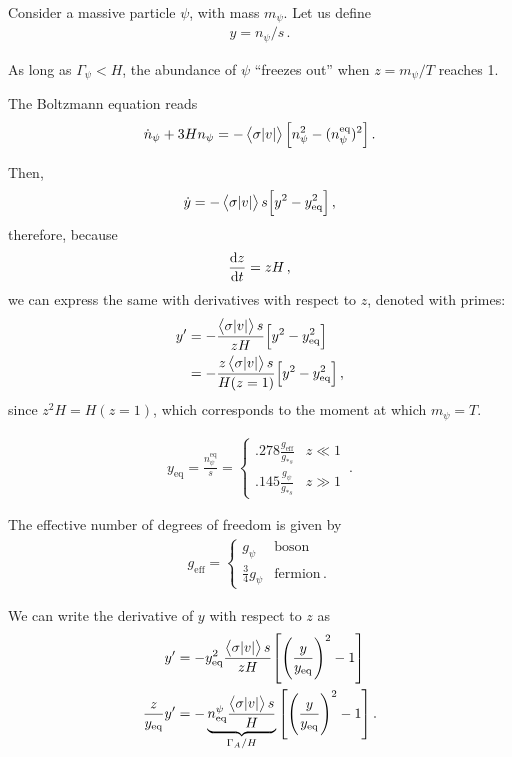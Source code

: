 \documentclass[main.tex]{subfiles}
\begin{document}
Consider a massive particle \(\psi \), with mass \(m_\psi \). 
Let us define 
%
\begin{align}
y = n_\psi / s
\,.
\end{align}

As long as \(\Gamma _\psi < H\), the abundance of \(\psi \) ``freezes out'' when \(z = m_\psi / T \) reaches 1. 

The Boltzmann equation reads 
%
\begin{align}
\dot{n}_\psi + 3 H n_\psi = - \expval{\sigma \abs{v}} \qty[n_\psi^2 - (n_\psi^{\text{eq}})^2]
\,.
\end{align}

Then, 
%
\begin{align}
\dot{y} = - \expval{\sigma \abs{v}} s \qty[y^2 - y^2 _{\text{eq}}]
\,,
\end{align}
%
therefore, because
%
\begin{align}
\dv{z}{t} = zH
\,,
\end{align}
%
we can express the same with derivatives with respect to \(z\), denoted with primes: 
%
\begin{align}
y' &= - \frac{\expval{\sigma \abs{v}} s}{z H} \qty[y^2 - y^2 _{\text{eq}}]  \\
&= - \frac{z\expval{\sigma \abs{v}} s}{H(z=1)} \qty[y^2 - y^2 _{\text{eq}}]
\,,
\end{align}
%
since \(z^2 H = H(z=1)\), which corresponds to the moment at which \(m_\psi = T\).


%
\begin{align}
y _{\text{eq}} = \frac{n_\psi^{\text{eq}}}{s} = \begin{cases}
    \num{.278} \frac{g _{\text{eff}}}{g_{*s}} & z \ll 1  \\
    \num{.145} \frac{g_\psi }{g_{*s}} & z \gg 1
\end{cases}
\,.
\end{align}

The effective number of degrees of freedom is given by 
%
\begin{align}
g _{\text{eff}} = \begin{cases}
    g_\psi & \text{boson} \\
    \frac{3}{4} g_\psi & \text{fermion} 
\,.
\end{cases}
\end{align}

We can write the derivative of \(y\) with respect to \(z\) as 
%
\begin{align}
y' &= - y^2 _{\text{eq}} \frac{\expval{\sigma \abs{v}} s}{zH} \qty[ \qty(\frac{y}{y _{\text{eq}}})^2 - 1] \\
\frac{z}{y _{\text{eq}}} y' &= - \underbrace{n^\psi  _{\text{eq}} \frac{\expval{\sigma \abs{v}} s}{H}}_{\Gamma_A / H} \qty[ \qty(\frac{y}{y _{\text{eq}}})^2 - 1] 
\,.
\end{align}
\end{document}
